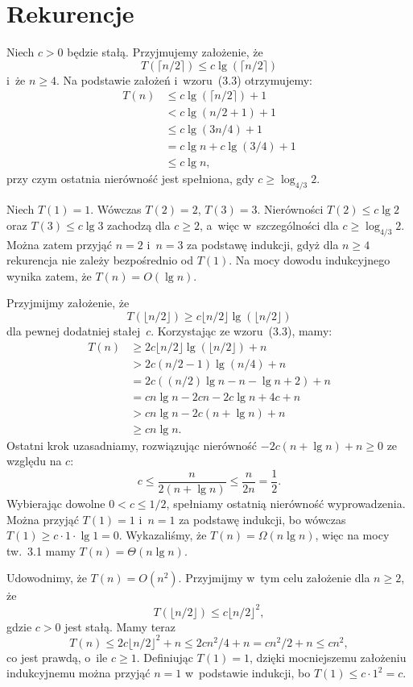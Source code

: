 \chapter{Rekurencje}


\exercise %
Niech $c>0$ będzie stałą. Przyjmujemy założenie, że
\[
    T(\lceil n/2\rceil)\le c\lg(\lceil n/2\rceil)
\]
i~że $n\ge4$. Na podstawie założeń i~wzoru~(3.3) otrzymujemy:
\begin{align*}
	T(n) &\le c\lg(\lceil n/2\rceil)+1 \\
	&< c\lg(n/2+1)+1 \\
	&\le c\lg(3n/4)+1 \\
	&= c\lg n+c\lg(3/4)+1 \\
	&\le c\lg n,
\end{align*}
przy czym ostatnia nierówność jest spełniona, gdy $c\ge\log_{4/3}2$.

Niech $T(1)=1$. Wówczas $T(2)=2$, $T(3)=3$. Nierówności $T(2)\le c\lg2$ oraz $T(3)\le c\lg3$ zachodzą dla $c\ge2$, a~więc w~szczególności dla $c\ge\log_{4/3}2$. Można zatem przyjąć $n=2$ i~$n=3$ za podstawę indukcji, gdyż dla $n\ge4$ rekurencja nie zależy bezpośrednio od $T(1)$. Na mocy dowodu indukcyjnego wynika zatem, że $T(n)=O(\lg n)$.

\exercise %
Przyjmijmy założenie, że
\[
	T(\lfloor n/2\rfloor) \ge c\lfloor n/2\rfloor\lg(\lfloor n/2\rfloor)
\]
dla pewnej dodatniej stałej~$c$. Korzystając ze wzoru~(3.3), mamy:
\begin{align*}
	T(n) &\ge 2c\lfloor n/2\rfloor\lg(\lfloor n/2\rfloor)+n \\
	&> 2c(n/2-1)\lg(n/4)+n \\
	&= 2c((n/2)\lg n-n-\lg n+2)+n \\
	&= cn\lg n-2cn-2c\lg n+4c+n \\
	&> cn\lg n-2c(n+\lg n)+n \\
	&\ge cn\lg n.
\end{align*}
Ostatni krok uzasadniamy, rozwiązując nierówność $-2c(n+\lg n)+n\ge0$ ze względu na $c$:
\[
	c \le \frac{n}{2(n+\lg n)} \le \frac{n}{2n} = \frac{1}{2}.
\]
Wybierając dowolne $0<c\le1/2$, spełniamy ostatnią nierówność wyprowadzenia. Można przyjąć $T(1)=1$ i~$n=1$ za podstawę indukcji, bo wówczas $T(1)\ge c\cdot1\cdot\lg1=0$. Wykazaliśmy, że $T(n)=\Omega(n\lg n)$, więc na mocy tw.~3.1 mamy $T(n)=\Theta(n\lg n)$.

\exercise %
Udowodnimy, że $T(n)=O(n^2)$. Przyjmijmy w~tym celu założenie dla $n\ge2$, że
\[
    T(\lfloor n/2\rfloor) \le c\lfloor n/2\rfloor^2,
\]
gdzie $c>0$ jest stałą. Mamy teraz
\[
	T(n) \le 2c\lfloor n/2\rfloor^2+n \le 2cn^2\!/4 + n = cn^2\!/2+n \le cn^2,
\]
co jest prawdą, o~ile $c\ge1$. Definiując $T(1)=1$, dzięki mocniejszemu założeniu indukcyjnemu można przyjąć $n=1$ w~podstawie indukcji, bo $T(1)\le c\cdot1^2=c$.

